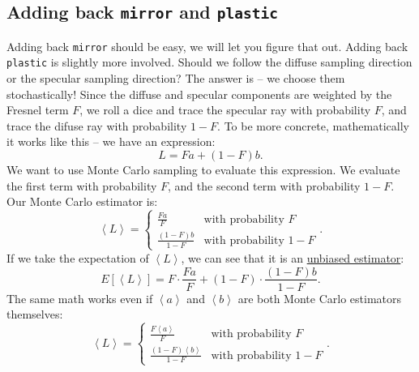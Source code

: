 \subsection{Adding back \protect\lstinline!mirror! and \protect\lstinline!plastic!}
Adding back \lstinline{mirror} should be easy, we will let you figure that out. Adding back \lstinline{plastic} is slightly more involved. Should we follow the diffuse sampling direction or the specular sampling direction? The answer is -- we choose them stochastically! Since the diffuse and specular components are weighted by the Fresnel term $F$, we roll a dice and trace the specular ray with probability $F$, and trace the difuse ray with probability $1-F$. To be more concrete, mathematically it works like this -- we have an expression:
\begin{equation}
L = F a + (1 - F) b.
\end{equation}
We want to use Monte Carlo sampling to evaluate this expression. We evaluate the first term with probability $F$, and the second term with probability $1-F$. Our Monte Carlo estimator is:
\begin{equation}
\left<L\right> = \begin{cases}
\frac{F a}{F} & \text{with probability } F \\
\frac{\left(1 - F\right) b}{1 - F} & \text{with probability } 1 - F
\end{cases}.
\label{eq:discrete_mc}
\end{equation}
If we take the expectation of $\left<L\right>$, we can see that it is an \href{https://en.wikipedia.org/wiki/Bias_of_an_estimator}{unbiased estimator}:
\begin{equation}
E\left[\left<L\right>\right] = F \cdot \frac{F a}{F} + (1 - F) \cdot \frac{(1 - F) b}{1 - F}.
\end{equation}
The same math works even if $\left<a\right>$ and $\left<b\right>$ are both Monte Carlo estimators themselves:
\begin{equation}
\left<L\right> = \begin{cases}
\frac{F \left<a\right>}{F} & \text{with probability } F \\
\frac{\left(1 - F\right) \left<b\right>}{1 - F} & \text{with probability } 1 - F
\end{cases}.
\end{equation}

